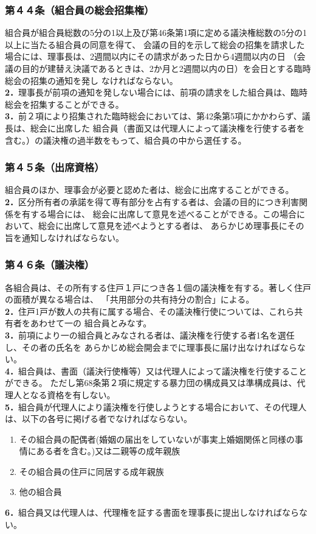 \documentclass[
  luatex,
  paper=a4paper,
  fontsize=11pt,
  jafontsize=11pt,
  jlreq_notes,
]{jlreq}
\begin{document}
  \subsubsection*{第４４条（組合員の総会招集権）}
  組合員が組合員総数の5分の1以上及び第46条第1項に定める議決権総数の5分の1以上に当たる組合員の同意を得て、
  会議の目的を示して総会の招集を請求した場合には、理事長は、2週間以内にその請求があった日から4週間以内の日
  （会議の目的が建替え決議であるときは、2か月と2週間以内の日）を会日とする臨時総会の招集の通知を発し
  なければならない。\\
  \textbf{2．}理事長が前項の通知を発しない場合には、前項の請求をした組合員は、臨時総会を招集することができる。\\
  \textbf{3．}前２項により招集された臨時総会においては、第42条第5項にかかわらず、議長は、総会に出席した
  組合員（書面又は代理人によって議決権を行使する者を含む。）の議決権の過半数をもって、組合員の中から選任する。
  \subsubsection*{第４５条（出席資格）}
  組合員のほか、理事会が必要と認めた者は、総会に出席することができる。\\
  \textbf{2．}区分所有者の承諾を得て専有部分を占有する者は、会議の目的につき利害関係を有する場合には、
  総会に出席して意見を述べることができる。この場合において、総会に出席して意見を述べようとする者は、
  あらかじめ理事長にその旨を通知しなければならない。
  \subsubsection*{第４６条（議決権）}
  各組合員は、その所有する住戸１戸につき各１個の議決権を有する。著しく住戸の面積が異なる場合は、
  「共用部分の共有持分の割合」による。\\
  \textbf{2．}住戸1戸が数人の共有に属する場合、その議決権行使については、これら共有者をあわせて一の
  組合員とみなす。\\
  \textbf{3．}前項により一の組合員とみなされる者は、議決権を行使する者1名を選任し、その者の氏名を
  あらかじめ総会開会までに理事長に届け出なければならない。\\
  \textbf{4．}組合員は、書面（議決行使権等）又は代理人によって議決権を行使することができる。
  ただし第68条第２項に規定する暴力団の構成員又は準構成員は、代理人となる資格を有しない。\\
  \textbf{5．}組合員が代理人により議決権を行使しようとする場合において、その代理人は、以下の各号に掲げる者でなければならない。
  \begin{enumerate}
    \item その組合員の配偶者(婚姻の届出をしていないが事実上婚姻関係と同様の事情にある者を含む。)又は二親等の成年親族
    \item その組合員の住戸に同居する成年親族
    \item 他の組合員
  \end{enumerate}
  \textbf{6．}組合員又は代理人は、代理権を証する書面を理事長に提出しなければならない。
\end{document}
